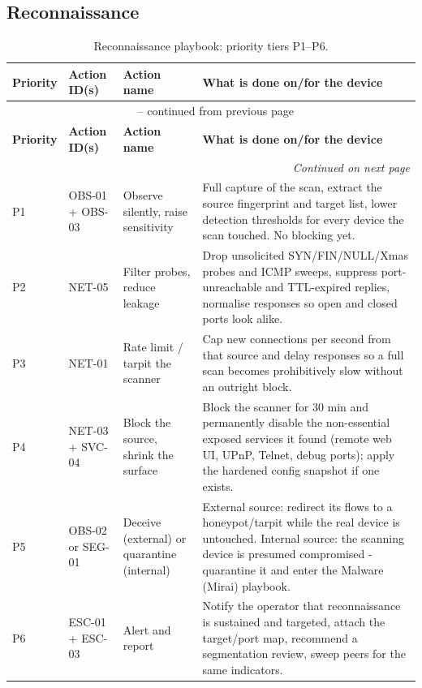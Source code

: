 \subsection{Reconnaissance}

\begin{longtable}{|p{}|p{}|p{}|p{}|}
\caption{Reconnaissance playbook: priority tiers P1--P6.}
\label{tab:playbook_recon}\\
\hline
\textbf{Priority} & \textbf{Action ID(s)} & \textbf{Action name} & \textbf{What is done on/for the device} \\
\hline
\endfirsthead
\multicolumn{4}{c}{\tablename\ \thetable{} -- continued from previous page}\\
\hline
\textbf{Priority} & \textbf{Action ID(s)} & \textbf{Action name} & \textbf{What is done on/for the device} \\
\hline
\endhead
\hline \multicolumn{4}{r}{\textit{Continued on next page}}\\
\endfoot
\hline
\endlastfoot
P1 & OBS-01 + OBS-03 & Observe silently, raise sensitivity & Full capture of the scan, extract the source fingerprint and target list, lower detection thresholds for every device the scan touched. No blocking yet. \\
\hline
P2 & NET-05 & Filter probes, reduce leakage & Drop unsolicited SYN/FIN/NULL/Xmas probes and ICMP sweeps, suppress port-unreachable and TTL-expired replies, normalise responses so open and closed ports look alike. \\
\hline
P3 & NET-01 & Rate limit / tarpit the scanner & Cap new connections per second from that source and delay responses so a full scan becomes prohibitively slow without an outright block. \\
\hline
P4 & NET-03 + SVC-04 & Block the source, shrink the surface & Block the scanner for 30 min and permanently disable the non-essential exposed services it found (remote web UI, UPnP, Telnet, debug ports); apply the hardened config snapshot if one exists. \\
\hline
P5 & OBS-02 or SEG-01 & Deceive (external) or quarantine (internal) & External source: redirect its flows to a honeypot/tarpit while the real device is untouched. Internal source: the scanning device is presumed compromised - quarantine it and enter the Malware (Mirai) playbook. \\
\hline
P6 & ESC-01 + ESC-03 & Alert and report & Notify the operator that reconnaissance is sustained and targeted, attach the target/port map, recommend a segmentation review, sweep peers for the same indicators. \\
\hline
\end{longtable}

